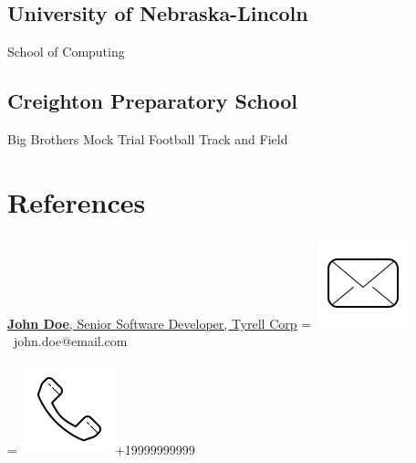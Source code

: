 \documentclass[]{latex/resume}
\begin{document}
\begin{minipage}[t]{0.25\textwidth}
    \subsection{University of Nebraska-Lincoln}
    School of Computing \\

    \sectionsep

    \subsection{Creighton Preparatory School} 
    Big Brothers \textbullet{} Mock Trial \textbullet{} Football \textbullet{} Track and Field 
    \\   

    \sectionsep


\section{References}

    \href{https://www.linkedin.com/company/john-doe/}{\textbf{John Doe}, Senior Software Developer, Tyrell Corp}
    \begingroup
        =\hbox{
            \includegraphics[scale=0.1,trim={0 1cm 0cm 0cm}]{latex/icons/mail.png}\hspace{0.3cm} john.doe@email.com
        }
        \parbox{\wd0}{}
    \endgroup
    
    \begingroup
        =\hbox{
        \includegraphics[scale=0.1,trim={0 1.25cm -0.4cm 0cm}]{latex/icons/phone.png}\hspace{0.3cm}+19999999999
        }
        \parbox{\wd0}{}
    \endgroup \\ 


\end{minipage}
\end{document}
